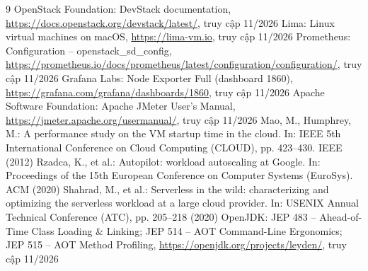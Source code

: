 \documentclass[runningheads]{llncs}
\begin{document}
\begin{thebibliography}{9}
 OpenStack Foundation: DevStack documentation, \url{https://docs.openstack.org/devstack/latest/}, truy cập 11/2026
 Lima: Linux virtual machines on macOS, \url{https://lima-vm.io}, truy cập 11/2026
 Prometheus: Configuration – openstack\_sd\_config, \url{https://prometheus.io/docs/prometheus/latest/configuration/configuration/}, truy cập 11/2026
 Grafana Labs: Node Exporter Full (dashboard 1860), \url{https://grafana.com/grafana/dashboards/1860}, truy cập 11/2026
 Apache Software Foundation: Apache JMeter User's Manual, \url{https://jmeter.apache.org/usermanual/}, truy cập 11/2026
 Mao, M., Humphrey, M.: A performance study on the VM startup time in the cloud. In: IEEE 5th International Conference on Cloud Computing (CLOUD), pp. 423--430. IEEE (2012)
 Rzadca, K., et al.: Autopilot: workload autoscaling at Google. In: Proceedings of the 15th European Conference on Computer Systems (EuroSys). ACM (2020)
 Shahrad, M., et al.: Serverless in the wild: characterizing and optimizing the serverless workload at a large cloud provider. In: USENIX Annual Technical Conference (ATC), pp. 205--218 (2020)
 OpenJDK: JEP 483 – Ahead-of-Time Class Loading \& Linking; JEP 514 – AOT Command-Line Ergonomics; JEP 515 – AOT Method Profiling, \url{https://openjdk.org/projects/leyden/}, truy cập 11/2026
\end{thebibliography}
\end{document}
